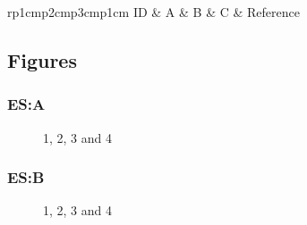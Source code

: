 \centering
\begin{table}[H]\footnotesize
	\caption{}
	\begin{tabular}{rp{1cm}p{2cm}p{3cm}p{1cm}}
		\hline
		ID & A & B & C & Reference \\
		\hline
		\hline
	\end{tabular}
\end{table}
\raggedright

\subsection{Figures}

\subsubsection{ES:A}

\begin{figure}[H]
	\centering
	\begin{minipage}[b]{0.5\linewidth}
	\end{minipage}\hfill
	\begin{minipage}[b]{0.5\linewidth}
	\end{minipage}\hfill	
	\begin{minipage}[b]{0.5\linewidth}
	\end{minipage}\hfill
	\begin{minipage}[b]{0.5\linewidth}
	\end{minipage}\hfill
	\caption{1, 2, 3 and 4}
	\label{fig:Figure1}
\end{figure} 

\subsubsection{ES:B}

\begin{figure}[H]
	\centering
	\begin{minipage}[b]{0.5\linewidth}
	\end{minipage}\hfill
	\begin{minipage}[b]{0.5\linewidth}
	\end{minipage}\hfill	
	\begin{minipage}[b]{0.5\linewidth}
	\end{minipage}\hfill
	\begin{minipage}[b]{0.5\linewidth}
	\end{minipage}\hfill
	\caption{1, 2, 3 and 4}
	\label{fig:Figure1}
\end{figure} 

